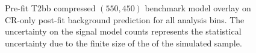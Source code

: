 \begin{figure}[!h]
{        \label{fig:T2bb_compressed_MR_4j}
    } \\
     ~~
     \\
    \caption{
        Pre-fit T2bb compressed $(550,450)$ benchmark model overlay on CR-only
        post-fit background prediction for all analysis bins. The uncertainty
        on the signal model counts represents the statistical uncertainty due
        to the finite size of the of the simulated sample.
    }
    \label{fig:T2bb_compressed_MR}
\end{figure}

